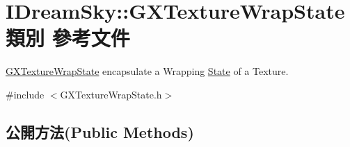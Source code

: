 \hypertarget{class_i_dream_sky_1_1_g_x_texture_wrap_state}{}\section{I\+Dream\+Sky\+:\+:G\+X\+Texture\+Wrap\+State 類別 參考文件}
\label{class_i_dream_sky_1_1_g_x_texture_wrap_state}


\hyperlink{class_i_dream_sky_1_1_g_x_texture_wrap_state}{G\+X\+Texture\+Wrap\+State} encapsulate a Wrapping \hyperlink{class_i_dream_sky_1_1_state}{State} of a Texture.  




{\ttfamily \#include $<$G\+X\+Texture\+Wrap\+State.\+h$>$}

\subsection*{公開方法(Public Methods)}
